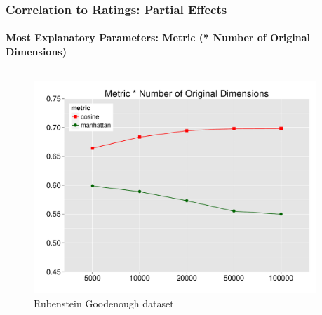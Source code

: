 \documentclass[t]{beamer} %
\begin{document}
\begin{frame}
  \frametitle{Correlation to Ratings: Partial Effects}
  \framesubtitle{Most Explanatory Parameters: Metric (* Number of Original Dimensions)}

  \vspace{-18pt}

  \begin{columns}
    
    \begin{column}{0.5\textwidth}
      \begin{figure} 
        \hspace*{-18pt} 
        \includegraphics[scale=0.30]{img/lapesa_rg_main_metric_origdim}
        \vspace{-10pt}
        \caption{Rubenstein Goodenough dataset}
      \end{figure}
    \end{column}

    \begin{column}{0.5\textwidth}
      \centering
      

\end{column}
\end{columns}
\end{frame}
\end{document}
